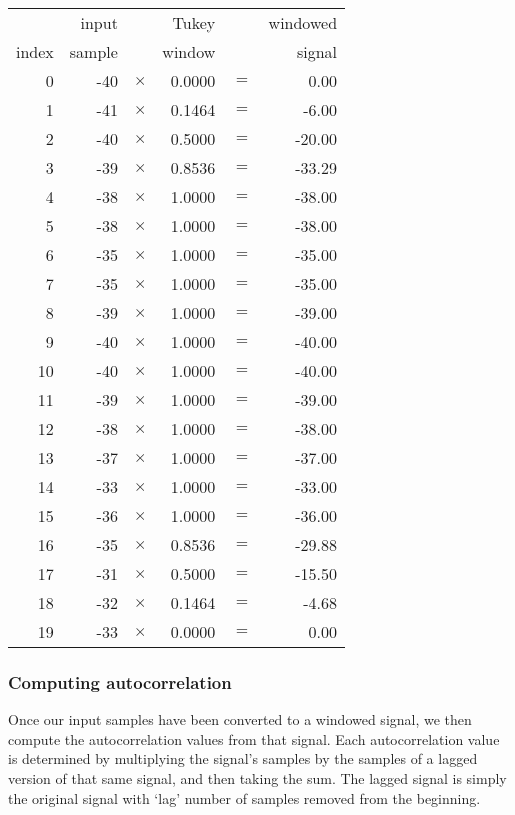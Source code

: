 {
\begin{tabular}{|r|r >{$}c<{$} r >{$}c<{$} r|}
\hline
& input & & Tukey & & windowed \\
index & sample & & window & & signal \\
\hline
0 & -40 & \times & 0.0000 & = & 0.00 \\
1 & -41 & \times & 0.1464 & = & -6.00 \\
2 & -40 & \times & 0.5000 & = & -20.00 \\
3 & -39 & \times & 0.8536 & = & -33.29 \\
4 & -38 & \times & 1.0000 & = & -38.00 \\
5 & -38 & \times & 1.0000 & = & -38.00 \\
6 & -35 & \times & 1.0000 & = & -35.00 \\
7 & -35 & \times & 1.0000 & = & -35.00 \\
8 & -39 & \times & 1.0000 & = & -39.00 \\
9 & -40 & \times & 1.0000 & = & -40.00 \\
10 & -40 & \times & 1.0000 & = & -40.00 \\
11 & -39 & \times & 1.0000 & = & -39.00 \\
12 & -38 & \times & 1.0000 & = & -38.00 \\
13 & -37 & \times & 1.0000 & = & -37.00 \\
14 & -33 & \times & 1.0000 & = & -33.00 \\
15 & -36 & \times & 1.0000 & = & -36.00 \\
16 & -35 & \times & 0.8536 & = & -29.88 \\
17 & -31 & \times & 0.5000 & = & -15.50 \\
18 & -32 & \times & 0.1464 & = & -4.68 \\
19 & -33 & \times & 0.0000 & = & 0.00 \\
\hline
\end{tabular}
}

\pagebreak

\subsubsection{Computing autocorrelation}

Once our input samples have been converted to a windowed signal,
we then compute the autocorrelation values from that signal.
Each autocorrelation value is determined by multiplying the signal's
samples by the samples of a lagged version of that same signal,
and then taking the sum.
The lagged signal is simply the original signal with `lag' number of
samples removed from the beginning.

